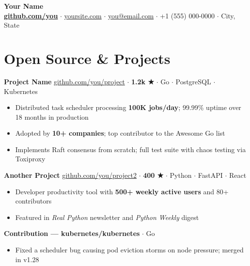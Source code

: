 \documentclass[10.5pt, letterpaper]{article}
\begin{document}
\begin{center}
  {\LARGE\textbf{Your Name}}\\[3pt]
  {\small
    \href{https://github.com/you}{\textbf{github.com/you}}
    $\cdot$ \href{https://yoursite.com}{yoursite.com}
    $\cdot$ \href{mailto:you@email.com}{you@email.com}
    $\cdot$ +1 (555) 000-0000
    $\cdot$ City, State
  }
\end{center}

\section{Open Source \& Projects}

\noindent\textbf{Project Name}
\hfill
\href{https://github.com/you/project}{\small\color{accent}github.com/you/project}
{\small $\cdot$ \textbf{1.2k ★} $\cdot$ Go $\cdot$ PostgreSQL $\cdot$ Kubernetes}
\begin{itemize}[leftmargin=*, noitemsep, topsep=2pt]
  \item Distributed task scheduler processing \textbf{100K jobs/day}; 99.99\% uptime over 18 months in production
  \item Adopted by \textbf{10+ companies}; top contributor to the Awesome Go list
  \item Implements Raft consensus from scratch; full test suite with chaos testing via Toxiproxy
\end{itemize}

\vspace{5pt}
\noindent\textbf{Another Project}
\hfill
\href{https://github.com/you/project2}{\small\color{accent}github.com/you/project2}
{\small $\cdot$ \textbf{400 ★} $\cdot$ Python $\cdot$ FastAPI $\cdot$ React}
\begin{itemize}[leftmargin=*, noitemsep, topsep=2pt]
  \item Developer productivity tool with \textbf{500+ weekly active users} and 80+ contributors
  \item Featured in \textit{Real Python} newsletter and \textit{Python Weekly} digest
\end{itemize}

\vspace{5pt}
\noindent\textbf{Contribution — kubernetes/kubernetes}
{\small $\cdot$ Go}
\begin{itemize}[leftmargin=*, noitemsep, topsep=2pt]
  \item Fixed a scheduler bug causing pod eviction storms on node pressure; merged in v1.28
\end{itemize}
\end{document}
